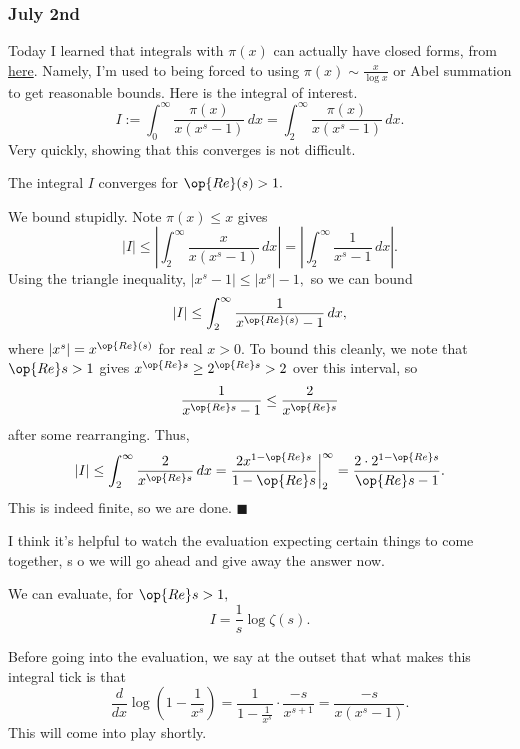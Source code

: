 \subsubsection{July 2nd}
Today I learned that integrals with $\pi(x)$ can actually have closed forms, from \href{https://math.stackexchange.com/a/2270227/869257}{here}. Namely, I'm used to being forced to using $\pi(x)\sim\frac x{\log x}$ or Abel summation to get reasonable bounds. Here is the integral of interest.
\[I:=\int_0^\infty\frac{\pi(x)}{x\left(x^s-1\right)}\,dx=\int_2^\infty\frac{\pi(x)}{x\left(x^s-1\right)}\,dx.\]
Very quickly, showing that this converges is not difficult.
\begin{lemma}
    The integral $I$ converges for $\op{Re}(s)>1.$
\end{lemma}
We bound stupidly. Note $\pi(x)\le x$ gives
\[|I|\le\left|\int_2^\infty\frac x{x\left(x^s-1\right)}\,dx\right|=\left|\int_2^\infty\frac1{x^s-1}\,dx\right|.\]
Using the triangle inequality, $\left|x^s-1\right|\le\left|x^s\right|-1,$ so we can bound
\[|I|\le\int_2^\infty\frac1{x^{\op{Re}(s)}-1}\,dx,\]
where $\left|x^s\right|=x^{\op{Re}(s)}$ for real $x>0.$ To bound this cleanly, we note that $\op{Re}s>1$ gives $x^{\op{Re}s}\ge2^{\op{Re}s}>2$ over this interval, so
\[\frac1{x^{\op{Re}s}-1}\le\frac2{x^{\op{Re}s}}\]
after some rearranging. Thus,
\[|I|\le\int_2^\infty\frac2{x^{\op{Re}s}}\,dx=\frac{2x^{1-\op{Re}s}}{1-\op{Re}s}\bigg|_2^\infty=\frac{2\cdot2^{1-\op{Re}s}}{\op{Re}s-1}.\]
This is indeed finite, so we are done. $\blacksquare$

I think it's helpful to watch the evaluation expecting certain things to come together, s   o we will go ahead and give away the answer now.
\begin{proposition}
    We can evaluate, for $\op{Re}s>1,$
    \[I=\frac1s\log\zeta(s).\]
\end{proposition}
Before going into the evaluation, we say at the outset that what makes this integral tick is that
\[\frac d{dx}\log\left(1-\frac1{x^s}\right)=\frac1{1-\frac1{x^s}}\cdot\frac{-s}{x^{s+1}}=\frac{-s}{x\left(x^s-1\right)}.\]
This will come into play shortly.

